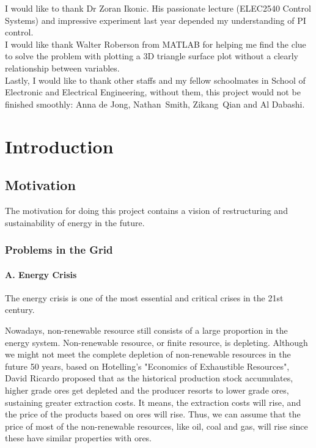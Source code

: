 \documentclass{report}
\begin{document}
I would like to thank Dr Zoran Ikonic. His passionate lecture (ELEC2540 Control Systems) and impressive experiment last year depended my understanding of PI control.\\

I would like thank Walter Roberson from MATLAB for helping me find the clue to solve the problem with plotting a 3D triangle surface plot without a clearly relationship between variables.\\

Lastly, I would like to thank other staffs and my fellow schoolmates in School of Electronic and Electrical Engineering, without them, this project would not be finished smoothly: Anna de Jong, Nathan Smith, Zikang Qian and Al Dabashi.\\



\afterpreface


\chapter{Introduction}
\section{Motivation}
The motivation for doing this project contains a vision of restructuring and sustainability of energy in the future.
\subsection{Problems in the Grid}
\subsubsection{A. Energy Crisis}
The energy crisis is one of the most essential and critical crises in the 21st century.

Nowadays, non-renewable resource still consists of a large proportion in the energy system. Non-renewable resource, or finite resource, is depleting. Although we might not meet the complete depletion of non-renewable resources in the future 50 years, based on Hotelling’s "Economics of Exhaustible Resources", David Ricardo proposed that as the historical production stock accumulates, higher grade ores get depleted and the producer resorts to lower grade ores, sustaining greater extraction costs. It means, the extraction costs will rise, and the price of the products based on ores will rise. Thus, we can assume that the price of most of the non-renewable resources, like oil, coal and gas, will rise since these have similar properties with ores.\\
\end{document}
